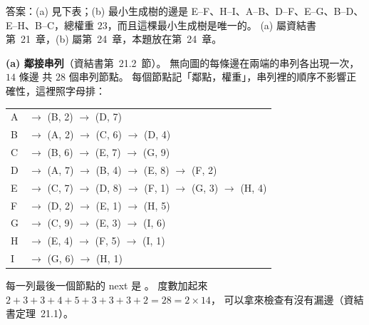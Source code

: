 \begin{pastsoln}
答案：(a) 見下表；(b) 最小生成樹的邊是 E--F、H--I、A--B、D--F、E--G、B--D、E--H、B--C，總權重
$23$，而且這棵最小生成樹是唯一的。 (a) 屬資結書第~21~章，(b) 屬第~24~章，本題放在第~24~章。

\textbf{(a) 鄰接串列}（資結書第~21.2~節）。 無向圖的每條邊在兩端的串列各出現一次，$14$ 條邊
共 $28$ 個串列節點。 每個節點記「鄰點，權重」，串列裡的順序不影響正確性，這裡照字母排：
\begin{center}
\begin{tabular}{l@{\quad}l}
A & $\to$ (B, 2) $\to$ (D, 7) \\
B & $\to$ (A, 2) $\to$ (C, 6) $\to$ (D, 4) \\
C & $\to$ (B, 6) $\to$ (E, 7) $\to$ (G, 9) \\
D & $\to$ (A, 7) $\to$ (B, 4) $\to$ (E, 8) $\to$ (F, 2) \\
E & $\to$ (C, 7) $\to$ (D, 8) $\to$ (F, 1) $\to$ (G, 3) $\to$ (H, 4) \\
F & $\to$ (D, 2) $\to$ (E, 1) $\to$ (H, 5) \\
G & $\to$ (C, 9) $\to$ (E, 3) $\to$ (I, 6) \\
H & $\to$ (E, 4) $\to$ (F, 5) $\to$ (I, 1) \\
I & $\to$ (G, 6) $\to$ (H, 1) \\
\end{tabular}
\end{center}
每一列最後一個節點的 next 是 \NIL。 度數加起來 $2+3+3+4+5+3+3+3+2 = 28 = 2 \times 14$，
可以拿來檢查有沒有漏邊（資結書定理~21.1）。


\end{pastsoln}
